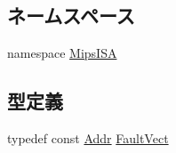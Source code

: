 \subsection*{ネームスペース}
\begin{DoxyCompactItemize}
\item 
namespace \hyperlink{namespaceMipsISA}{MipsISA}
\end{DoxyCompactItemize}
\subsection*{型定義}
\begin{DoxyCompactItemize}
\item 
typedef const \hyperlink{base_2types_8hh_af1bb03d6a4ee096394a6749f0a169232}{Addr} \hyperlink{namespaceMipsISA_a5c26c9764cc05486454998efadf79833}{FaultVect}
\end{DoxyCompactItemize}
